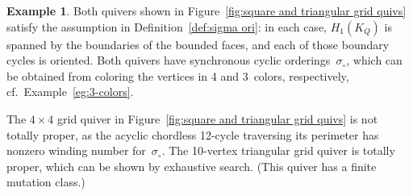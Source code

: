 \documentclass[11pt, letterpaper]{amsart}
\theoremstyle{definition}
\newtheorem{example}[theorem]{Example}
\numberwithin{equation}{section}
\newcommand\GQ{K_Q}
\begin{document}
\begin{example}
Both quivers shown in Figure~\ref{fig:square and triangular grid quivs} 
satisfy the assumption in Definition~\ref{def:sigma ori}:
in each case, $H_1(\GQ)$ is spanned by the boundaries of the bounded faces,
and each of those boundary cycles is oriented. 
Both quivers have synchronous cyclic orderings~$\sigma_{\circ}$,
which can be obtained from coloring the vertices in 4 and 3~colors, respectively, cf.\ Example~\ref{eg:3-colors}. 

The $4\times 4$ grid quiver in Figure~\ref{fig:square and triangular grid quivs} is not totally proper, 
as the acyclic chordless 12-cycle traversing its perimeter has nonzero winding number for~$\sigma_{\circ}$. 
The 10-vertex triangular grid quiver is totally proper, which can be shown by exhaustive search.
(This quiver has a finite mutation class.) 
\end{example}
\end{document}
